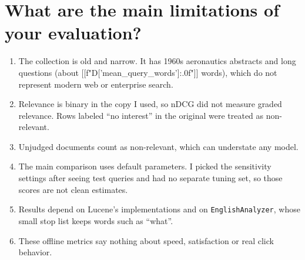 \section{What are the main limitations of your evaluation?}
\begin{enumerate}
\item The collection is old and narrow. It has 1960s aeronautics abstracts and long questions (about [[f"{D['mean_query_words']:.0f}"]] words), which do not represent modern web or enterprise search.
\item Relevance is binary in the copy I used, so nDCG did not measure graded relevance. Rows labeled ``no interest'' in the original were treated as non-relevant.
\item Unjudged documents count as non-relevant, which can understate any model.
\item The main comparison uses default parameters. I picked the sensitivity settings after seeing test queries and had no separate tuning set, so those scores are not clean estimates.
\item Results depend on Lucene's implementations and on \texttt{EnglishAnalyzer}, whose small stop list keeps words such as ``what''.
\item These offline metrics say nothing about speed, satisfaction or real click behavior.
\end{enumerate}

